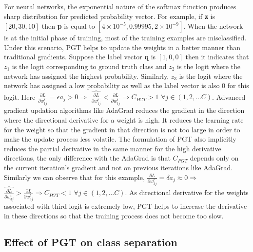 \documentclass[times,sort&compress]{elsarticle}
\begin{document}
For neural networks, the exponential nature of the softmax function produces sharp
distribution for predicted probability vector. For example, if \textbf{z} is $[20, 30,
10]$ then \textbf{p} is equal to $[4\times 10^{-5},  0.99995, 2\times10^{-9}]$. When the
network is at the initial phase of training, most of the training examples are
misclassified. Under this scenario, PGT helps to update the weights in a better manner
than traditional gradients. Suppose the label vector \textbf{q} is $[1, 0, 0]$ then it
indicates that $z_1$ is the logit corresponding to ground truth class and $z_2$ is the
logit where the network has assigned the highest probability. Similarly, $z_3$ is the
logit where the network has assigned a low probability as well as the label vector is
also $0$ for this logit. Here $\frac{\partial L}{\partial w_{1j}^{t}} = \epsilon a_j > 0
\Rightarrow$ $ \widehat{\frac{\partial L}{\partial w_{1j}^{t}}} < \frac{\partial
L}{\partial w_{1j}^{t}} \Rightarrow C_{PGT} > 1$ $\forall j \in (1, 2,\ldots C)$.
Advanced gradient updation algorithms like AdaGrad \cite{duchi2011adaptive} reduces the
gradient in the direction where the directional derivative for a weight is high. It
reduces the learning rate for the weight so that the gradient in that direction is not
too large in order to make the update process less volatile. The formulation of PGT also
implicitly reduces the partial derivative in the same manner for the high derivative
directions, the only difference with the AdaGrad is that $C_{PGT}$ depends only on the
current iteration's gradient and not on previous iterations like AdaGrad. Similarly we
can observe that for this example, $\frac{\partial L}{\partial w_{3j}^{t}} = \delta a_j
\approx 0 \Rightarrow$ $  \widehat{\frac{\partial L}{\partial w_{3j}^{t}}} >
\frac{\partial L}{\partial w_{3j}^{t}} \Rightarrow C_{PGT} < 1$ $\forall j \in (1,
2,\ldots C)$. As directional derivative for the weights associated with third logit is
extremely low, PGT helps to increase the derivative in these directions so that the
training process does not become too slow.



\subsection{Effect of PGT on class separation}
\label{sec:pgt_class_separation}
\end{document}
